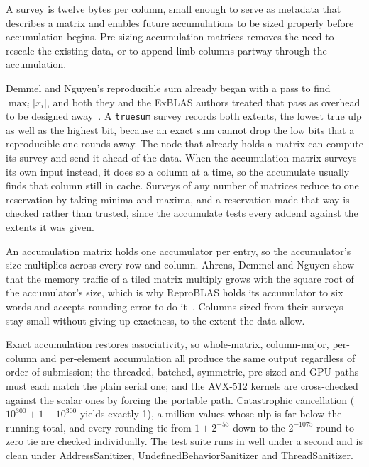 \documentclass[acmsmall,screen,review]{acmart}
\newcommand{\code}[1]{\texttt{#1}}
\newcommand{\truesum}{\code{truesum}}
\begin{document}
A survey is twelve bytes per column, small enough to serve as metadata that describes a matrix and enables future accumulations to be sized properly before accumulation begins. Pre-sizing accumulation matrices removes the need to rescale the existing data, or to append limb-columns partway through the accumulation.

Demmel and Nguyen's reproducible sum already began with a pass to find $\max_i |x_i|$, and both they and the ExBLAS authors treated that pass as overhead to be designed away~\cite{demmel2013,iakymchuk2015}. A \truesum{} survey records both extents, the lowest true ulp as well as the highest bit, because an exact sum cannot drop the low bits that a reproducible one rounds away. The node that already holds a matrix can compute its survey and send it ahead of the data. When the accumulation matrix surveys its own input instead, it does so a column at a time, so the accumulate usually finds that column still in cache. Surveys of any number of matrices reduce to one reservation by taking minima and maxima, and a reservation made that way is checked rather than trusted, since the accumulate tests every addend against the extents it was given.

An accumulation matrix holds one accumulator per entry, so the accumulator's size multiplies across every row and column. Ahrens, Demmel and Nguyen show that the memory traffic of a tiled matrix multiply grows with the square root of the accumulator's size, which is why ReproBLAS holds its accumulator to six words and accepts rounding error to do it~\cite{ahrens2016}. Columns sized from their surveys stay small without giving up exactness, to the extent the data allow.

Exact accumulation restores associativity, so whole-matrix, column-major, per-column and per-element accumulation all produce the same output regardless of order of submission; the threaded, batched, symmetric, pre-sized and GPU paths must each match the plain serial one; and the AVX-512 kernels are cross-checked against the scalar ones by forcing the portable path. Catastrophic cancellation ($10^{300} + 1 - 10^{300}$ yields exactly 1), a million values whose ulp is far below the running total, and every rounding tie from $1 + 2^{-53}$ down to the $2^{-1075}$ round-to-zero tie are checked individually. The test suite runs in well under a second and is clean under AddressSanitizer, UndefinedBehaviorSanitizer and ThreadSanitizer.
\end{document}
